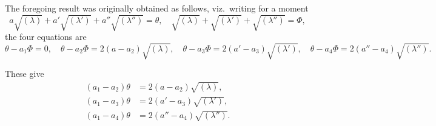 \documentclass[11pt,a4paper]{article}
\theoremstyle{plain}
\begin{document}
\newpage
\setcounter{equation}{19}

The foregoing result was originally obtained as follows, viz.~writing for a moment
\begin{equation}
a\sqrt{(\lambda)} + a'\sqrt{(\lambda')} + a''\sqrt{(\lambda'')} = \theta, \quad \sqrt{(\lambda)} + \sqrt{(\lambda')} + \sqrt{(\lambda'')} = \Phi,
\end{equation}
the four equations are
\begin{equation}
\theta - a_1\Phi = 0, \quad \theta - a_2\Phi = 2(a-a_2)\sqrt{(\lambda)}, \quad \theta - a_3\Phi = 2(a'-a_3)\sqrt{(\lambda')}, \quad \theta - a_4\Phi = 2(a''-a_4)\sqrt{(\lambda'')}.
\end{equation}

These give
\begin{align}
(a_1-a_2)\theta &= 2(a-a_2)\sqrt{(\lambda)}, \\
(a_1-a_3)\theta &= 2(a'-a_3)\sqrt{(\lambda')}, \\
(a_1-a_4)\theta &= 2(a''-a_4)\sqrt{(\lambda'')}.
\end{align}
\end{document}
